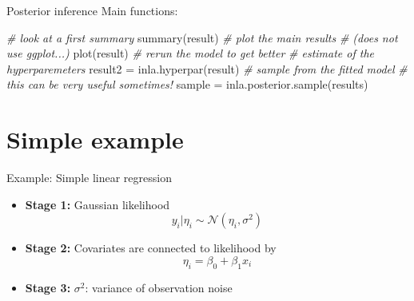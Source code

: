 \documentclass[
  handout]{beamer}
\newenvironment{Shaded}{\begin{snugshade}}{\end{snugshade}}
\newcommand{\CommentTok}[1]{\textcolor[rgb]{0.56,0.35,0.01}{\textit{#1}}}
\newcommand{\FunctionTok}[1]{\textcolor[rgb]{0.00,0.00,0.00}{#1}}
\newcommand{\NormalTok}[1]{#1}
\newcommand{\OtherTok}[1]{\textcolor[rgb]{0.56,0.35,0.01}{#1}}
\begin{document}
\begin{frame}[fragile]{Posterior inference}
\protect\hypertarget{posterior-inference}{}
Main functions:

\begin{Shaded}
\begin{Highlighting}[]
\CommentTok{\# look at a  first summary}
\FunctionTok{summary}\NormalTok{(result)}
\CommentTok{\# plot the main results}
\CommentTok{\# (does not use ggplot...)}
\FunctionTok{plot}\NormalTok{(result)}
\CommentTok{\# rerun the model to get better}
\CommentTok{\# estimate of the hyperparemeters}
\NormalTok{result2 }\OtherTok{=} \FunctionTok{inla.hyperpar}\NormalTok{(result)}
\CommentTok{\# sample from the fitted model}
\CommentTok{\# this can be very useful sometimes!}
\NormalTok{sample }\OtherTok{=} \FunctionTok{inla.posterior.sample}\NormalTok{(results)}
\end{Highlighting}
\end{Shaded}
\end{frame}

\hypertarget{simple-example}{%
\section{Simple example}\label{simple-example}}

\begin{frame}{Example: Simple linear regression}
\protect\hypertarget{example-simple-linear-regression}{}
\begin{itemize}
\item
  \textbf{Stage 1:} Gaussian likelihood \[
  y_i | \eta_i \sim \mathcal{N}(\eta_i, \sigma^2)
  \]
\item
  \textbf{Stage 2:} Covariates are connected to likelihood by \[
  \eta_i = \beta_0 + \beta_1 x_i
  \]
\item
  \textbf{Stage 3:} \(\sigma^2\): variance of observation noise
\end{itemize}
\end{frame}
\end{document}
